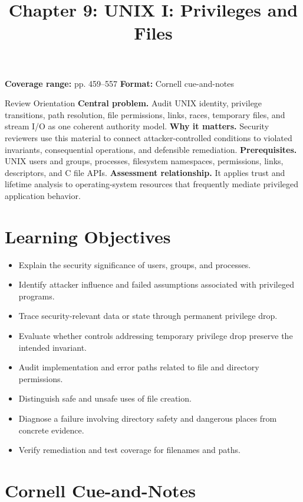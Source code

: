 \documentclass[11pt,letterpaper]{article}
\title{Chapter 9: UNIX I: Privileges and Files}
\author{}
\date{}
\begin{document}
\maketitle

\begin{center}
\small\color{Meta}\textbf{Coverage range:} pp. 459--557 \quad\textbullet\quad \textbf{Format:} Cornell cue-and-notes
\end{center}
\vspace{0.25em}
\begin{CornellOverviewBox}{Review Orientation}
\textbf{Central problem.} Audit UNIX identity, privilege transitions, path resolution, file permissions, links, races, temporary files, and stream I/O as one coherent authority model.
\textbf{Why it matters.} Security reviewers use this material to connect attacker-controlled conditions to violated invariants, consequential operations, and defensible remediation.
\textbf{Prerequisites.} UNIX users and groups, processes, filesystem namespaces, permissions, links, descriptors, and C file APIs.
\textbf{Assessment relationship.} It applies trust and lifetime analysis to operating-system resources that frequently mediate privileged application behavior.
\end{CornellOverviewBox}
\section{Learning Objectives}
\begin{itemize}
\item Explain the security significance of users, groups, and processes.
\item Identify attacker influence and failed assumptions associated with privileged programs.
\item Trace security-relevant data or state through permanent privilege drop.
\item Evaluate whether controls addressing temporary privilege drop preserve the intended invariant.
\item Audit implementation and error paths related to file and directory permissions.
\item Distinguish safe and unsafe uses of file creation.
\item Diagnose a failure involving directory safety and dangerous places from concrete evidence.
\item Verify remediation and test coverage for filenames and paths.
\end{itemize}
\section{Cornell Cue-and-Notes}
\end{document}
